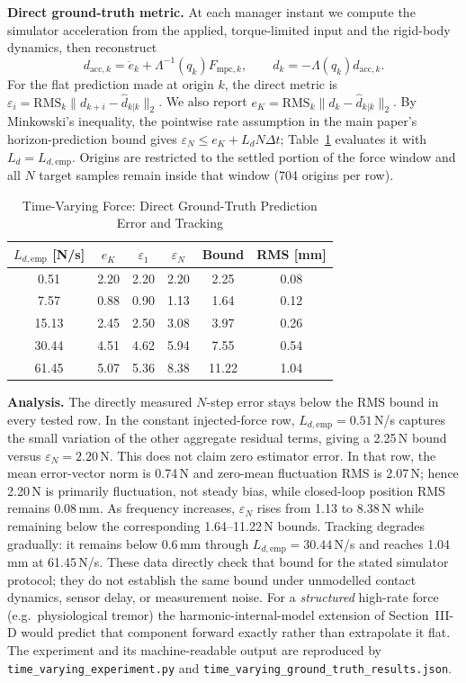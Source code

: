 \documentclass[journal]{IEEEtran}
\newcommand{\Fmpck}[1]{F_{\text{mpc},#1}}
\newcommand{\dhat}{\hat{d}}
\begin{document}
\textbf{Direct ground-truth metric.} At each manager instant we compute
the simulator acceleration from the applied, torque-limited input and the
rigid-body dynamics, then reconstruct
\begin{equation*}
d_{\mathrm{acc},k}=\ddot e_k+\Lambda^{-1}(q_k)\Fmpck{k},\qquad
d_k=-\Lambda(q_k)d_{\mathrm{acc},k}.
\end{equation*}
For the flat prediction made at origin $k$, the direct metric is
$\varepsilon_i=\mathrm{RMS}_k\|d_{k+i}-\dhat_{k|k}\|_2$. We also report
$e_K=\mathrm{RMS}_k\|d_k-\dhat_{k|k}\|_2$. By Minkowski's inequality,
the pointwise rate assumption in the main paper's horizon-prediction bound
gives $\varepsilon_N\le e_K+L_dN\Delta t$; Table~\ref{tab:tv} evaluates it
with $L_d=L_{d,\mathrm{emp}}$. Origins are restricted
to the settled portion of the force window and all $N$ target samples
remain inside that window (704 origins per row).

\begin{table}[!t]
\caption{Time-Varying Force: Direct Ground-Truth Prediction Error and Tracking}
\label{tab:tv}
\renewcommand{\arraystretch}{1.0}
\footnotesize
\setlength{\tabcolsep}{3pt}
\begin{tabular}{cccccc}
\toprule
$L_{d,\mathrm{emp}}$ [N/s] & $e_K$ & $\varepsilon_1$ & $\varepsilon_N$ & Bound & RMS [mm]\\
\midrule
0.51  & 2.20 & 2.20 & 2.20 & 2.25 & 0.08\\
7.57  & 0.88 & 0.90 & 1.13 & 1.64 & 0.12\\
15.13 & 2.45 & 2.50 & 3.08 & 3.97 & 0.26\\
30.44 & 4.51 & 4.62 & 5.94 & 7.55 & 0.54\\
61.45 & 5.07 & 5.36 & 8.38 & 11.22 & 1.04\\
\bottomrule
\end{tabular}
\end{table}

\textbf{Analysis.} The directly measured $N$-step error stays below the
RMS bound in every tested row. In the constant injected-force row,
$L_{d,\mathrm{emp}}=0.51$\,N/s captures the small variation of the other
aggregate residual terms, giving a 2.25\,N bound versus
$\varepsilon_N=2.20$\,N. This does not claim zero estimator error. In that
row, the mean error-vector norm is 0.74\,N and zero-mean fluctuation RMS is
2.07\,N; hence 2.20\,N is primarily fluctuation, not steady bias, while
closed-loop position RMS remains 0.08\,mm. As frequency increases, $\varepsilon_N$
rises from 1.13 to 8.38\,N while remaining below the corresponding
1.64--11.22\,N bounds. Tracking degrades gradually: it remains below
0.6\,mm through $L_{d,\mathrm{emp}}=30.44$\,N/s and reaches 1.04\,mm at
61.45\,N/s.
These data directly check that bound for the stated simulator protocol;
they do not establish the same bound under unmodelled contact dynamics,
sensor delay, or measurement noise. For a
\emph{structured} high-rate force (e.g.\ physiological tremor) the
harmonic-internal-model extension of Section~III-D would predict that
component forward exactly rather than extrapolate it flat. The
experiment and its machine-readable output are reproduced by
\texttt{time\_varying\_experiment.py} and
\texttt{time\_varying\_ground\_truth\_results.json}.
\end{document}
